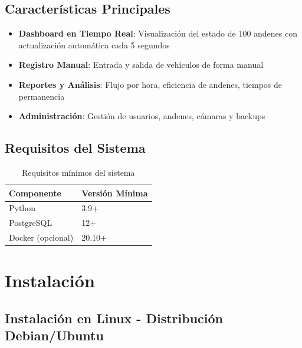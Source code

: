\documentclass[12pt,a4paper]{article}
\begin{document}
\subsection{Características Principales}

\begin{itemize}[leftmargin=2cm]
    \item[\faIcon{tachometer-alt}] \textbf{Dashboard en Tiempo Real}: Visualización del estado de 100 andenes con actualización automática cada 5 segundos
    \item[\faIcon{clipboard-list}] \textbf{Registro Manual}: Entrada y salida de vehículos de forma manual
    \item[\faIcon{chart-bar}] \textbf{Reportes y Análisis}: Flujo por hora, eficiencia de andenes, tiempos de permanencia
    \item[\faIcon{cogs}] \textbf{Administración}: Gestión de usuarios, andenes, cámaras y backups
\end{itemize}

\subsection{Requisitos del Sistema}

\begin{table}[H]
    \centering
    \begin{tabular}{|l|l|}
        \hline
        \textbf{Componente} & \textbf{Versión Mínima} \\
        \hline
        Python & 3.9+ \\
        PostgreSQL & 12+ \\
        Docker (opcional) & 20.10+ \\
        \hline
    \end{tabular}
    \caption{Requisitos mínimos del sistema}
\end{table}

\section{Instalación}

\subsection{Instalación en Linux - Distribución Debian/Ubuntu}
\end{document}
